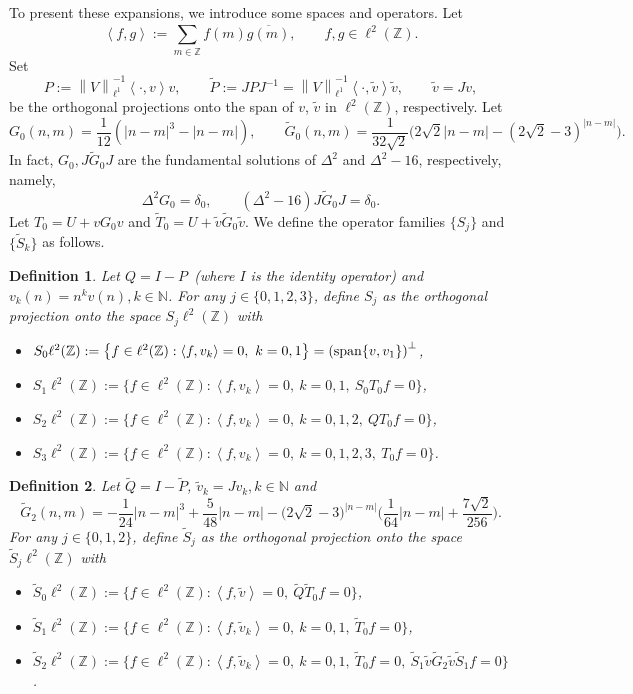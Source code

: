 \documentclass[reqno, 11pt]{amsart}
\newtheorem{definition}{Definition}[section]
\newcommand\Z{\mathbb{Z}}
\newcommand\N{\mathbb{N}}
\numberwithin{equation}{section}
\begin{document}
To present these expansions, we introduce some spaces and operators. Let
$$\left<f,g\right>:=\sum\limits_{m\in\Z}^{}f(m)\overline{g(m)},\qquad f,g\in\ell^2(\Z).$$
Set
\begin{equation}\label{P}
P:=\left\|V\right\|^{-1}_{\ell^1}\left<\cdot,v\right>v,\qquad \widetilde{P}:=JPJ^{-1}=\left\|V\right\|^{-1}_{\ell^1}\left<\cdot,\tilde{v}\right>\tilde{v},\qquad \tilde{v}=Jv,
\end{equation}
be the orthogonal projections onto the span of $v$, $\tilde{v}$ in $\ell^2(\Z)$, respectively.
Let 
$$G_0(n,m)=\frac{1}{12}\left(|n-m|^3-|n-m|\right),\qquad\widetilde{G}_{0}(n,m)=\frac{1}{32\sqrt2}\big(2\sqrt2|n-m|-{(2\sqrt2-3)}^{|n-m|}\big).$$ In fact, $G_0,J\widetilde{G}_0J$ are  the fundamental solutions of $\Delta^2$ and $\Delta^2-16$, respectively, namely, $$\Delta^2G_0=\delta_0,\qquad(\Delta^2-16)J\widetilde{G}_0J=\delta_0.$$ 
Let 
$T_0=U+vG_0v$ and $\widetilde{T}_0=U+\tilde{v}\widetilde{G}_0\tilde{v}.$ We define the operator families $\{S_j\}$ and $\{\widetilde{S}_k\}$ as follows.
\begin{definition}\label{definition of Sj}
Let $Q=I-P$~{\rm(}where $I$ is the identity operator{\rm)} and $v_k(n)=n^kv(n),k\in\N$. For any $j\in\{0,1,2,3\}$, define $S_j$ as the orthogonal projection onto the space $S_j\ell^2(\Z)$ with
\begin{itemize}
\item[{\rm(i)}]$S_0\ell^2(\Z):=\big\{f\in\ell^2(\Z):\left<f,v_{k}\right>=0,\ k=0,1\big\}=\left({\rm span}\{v,v_1\}\right)^{\bot}$,
\item[{\rm(ii)}]$S_1\ell^2(\Z):=\big\{f\in\ell^2(\Z):\left<f,v_{k}\right>=0,\ k=0,1,\ S_0T_0f=0\big\}$,
\item[{\rm(iii)}] $S_2\ell^2(\Z):=\big\{f\in\ell^2(\Z):\left<f,v_{k}\right>=0,\ k=0,1,2,\ QT_0f=0\big\}$,
\item[{\rm(iv)}] $S_3\ell^2(\Z):=\big\{f\in\ell^2(\Z):\left<f,v_{k}\right>=0,\ k=0,1,2,3,\ T_0f=0\big\}$.
\end{itemize}
\end{definition}
\begin{definition}\label{definition of Sjtilde}
Let $\widetilde{Q}=I-\widetilde{P}$, $\tilde{v}_k=Jv_k,k\in\N$ and 
$$\widetilde{G}_{2}(n,m)=-\frac{1}{24}|n-m|^3+\frac{5}{48}|n-m|-\big(2\sqrt2-3\big)^{|n-m|}\Big(\frac{1}{64}|n-m|+\frac{7\sqrt{2}}{256}\Big).$$
For any $j\in\{0,1,2\}$, define $\widetilde{S}_j$ as the orthogonal projection onto the space $\widetilde{S}_j\ell^2(\Z)$ with
\begin{itemize}
\item[{\rm(i)}]$\widetilde{S}_0\ell^2(\Z):=\big\{f\in\ell^2(\Z):\left<f,\tilde{v}\right>=0,\ \widetilde{Q}\widetilde{T}_0f=0\big\}$,
\item[{\rm(ii)}]$\widetilde{S}_1\ell^2(\Z):=\big\{f\in\ell^2(\Z):\left<f,\tilde{v}_k\right>=0,\ k=0,1,\ \widetilde{T}_0f=0\big\}$,
\item[{\rm(iii)}]$\widetilde{S}_2\ell^2(\Z):=\big\{f\in\ell^2(\Z):\left<f,\tilde{v}_k\right>=0,\ k=0,1,\ \widetilde{T}_0f=0,\ \widetilde{S}_1\tilde{v}\widetilde{G}_2\tilde{v}\widetilde{S}_1f=0\big\}$.
\end{itemize}
\end{definition}
\end{document}
